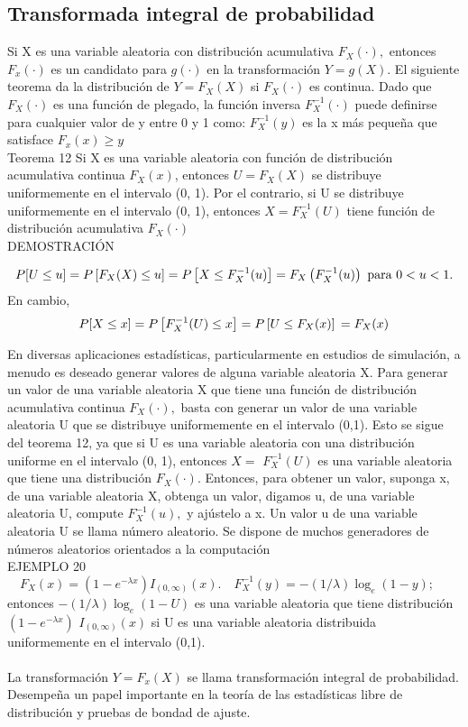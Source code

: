 \subsection{Transformada integral de probabilidad}
Si X es una variable aleatoria con distribución acumulativa $F_{X}(\cdot),$ entonces $F_{x}(\cdot)$ es un candidato para $g(\cdot)$ en la transformación $Y=g(X) .$ El siguiente teorema da la distribución de $Y=F_{X}(X)$ si $F_{X}(\cdot)$ es continua. Dado que $F_{X}(\cdot)$ es una función de plegado, la función inversa $F_{X}^{-1}(\cdot)$ puede definirse para cualquier valor de y entre 0 y 1 como: $F_{X}^{-1}(y)$ es la x más pequeña que satisface $F_{x}(x) \geq y$\\

Teorema 12 Si X es una variable aleatoria con función de distribución acumulativa continua $F_{X}(x)$, entonces $U=F_{X}(X)$  se distribuye uniformemente en el intervalo (0, 1). Por el contrario, si U se distribuye uniformemente en el intervalo (0, 1), entonces $X=F_{X}^{-1}(U)$ tiene función de distribución acumulativa $F_{X}(\cdot)$\\

DEMOSTRACIÓN

$$P[U \leq u]=P\left[F_{X}(X) \leq u\right]=P\left[X \leq F_{X}^{-1}(u)\right]=\\
F_{X}\left(F_{X}^{-1}(u)\right)
\text { para } 0<u<1 .$$
En cambio, $$ P[X \leq x]=P\left[F_{X}^{-1}(U) \leq x\right]=P\left[U \leq F_{X}(x)\right]\\
=F_{X}(x)$$

En diversas aplicaciones estadísticas, particularmente en estudios de simulación, a menudo es deseado generar valores de alguna variable aleatoria X. Para generar un valor de una variable aleatoria X que tiene una función de distribución acumulativa continua $F_{X}(\cdot),$ basta con generar un valor de una variable aleatoria U que se distribuye uniformemente en el intervalo (0,1). Esto se sigue del teorema 12, ya que si U es una variable aleatoria con una distribución uniforme en el intervalo (0, 1), entonces $X=$ $F_{X}^{-1}(U)$ es una variable aleatoria que tiene una distribución $F_{X}(\cdot) .$  Entonces, para obtener un valor, suponga x, de una variable aleatoria X, obtenga un valor, digamos u, de una variable aleatoria U, compute $F_{X}^{-1}(u),$ y ajústelo a x. Un valor u de una variable aleatoria U se llama número aleatorio. Se dispone de muchos generadores de números aleatorios orientados a la computación\\

EJEMPLO 20 $\quad F_{X}(x)=\left(1-e^{-\lambda x}\right) I_{(0, \infty)}(x) . \quad F_{X}^{-1}(y)=-(1 / \lambda) \log _{e}(1-y) ;$ entonces $-(1 / \lambda) \log _{e}(1-U)$ es una variable aleatoria que tiene distribución $\left(1-e^{-\lambda x}\right)$ $I_{(0, \infty)}(x)$  si U es una variable aleatoria distribuida uniformemente en el intervalo (0,1).\\\\
La transformación $Y=F_{x}(X)$ se llama transformación integral de probabilidad. Desempeña un papel importante en la teoría de las estadísticas libre de distribución y pruebas de bondad de ajuste.
